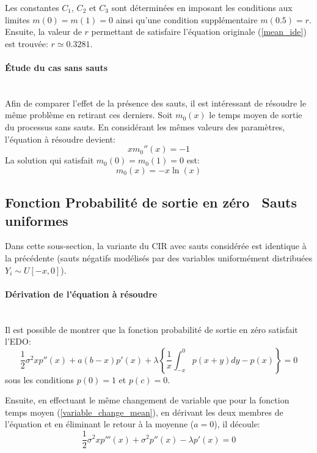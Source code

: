 Les constantes $C_1$, $C_2$ et $C_3$ sont déterminées en imposant les conditions aux limites $m(0)=m(1)=0$ ainsi qu'une condition supplémentaire $m(0.5)=r$. Ensuite, la valeur de $r$ permettant de satisfaire l'équation originale (\ref{mean_ide}) est trouvée: $r\simeq0.3281$.

\paragraph{Étude du cas sans sauts}\phantom{}\\
Afin de comparer l'effet de la présence des sauts, il est intéressant de résoudre le même problème en retirant ces derniers. Soit $m_0(x)$ le temps moyen de sortie du processus sans sauts. En considérant les mêmes valeurs des paramètres, l'équation à résoudre devient:
\begin{equation}\label{mean_3rd_order_without_jumps}
    xm_0''(x)=-1
\end{equation}
La solution qui satisfait $m_0(0)=m_0(1)=0$ est:
\begin{equation}\label{sol_mean_with_0_jumps}
    m_0(x)=-x\ln(x)
\end{equation}

\subsection{Fonction Probabilité de sortie en zéro \textemdash~Sauts uniformes}\label{subsection_probability_jumps}
Dans cette sous-section, la variante du \ac{CIR} avec sauts considérée est identique à la précédente (sauts négatifs modélisés par des variables uniformément distribuées $Y_i\sim U[-x,0]$).

\paragraph{Dérivation de l'équation à résoudre}\phantom{}\\
Il est possible de montrer que la fonction probabilité de sortie en zéro satisfait l'\acs{EDO}:
\begin{equation}\label{probability_ide}
    \frac{1}{2}\sigma^2xp''(x)+a(b-x)p'(x)+\lambda\left\{\frac{1}{x}\int_{-x}^0p(x+y)dy-p(x)\right\}=0
\end{equation}
sous les conditions $p(0)=1$ et $p(c)=0$.

Ensuite, en effectuant le même changement de variable que pour la fonction temps moyen (\ref{variable_change_mean}), en dérivant les deux membres de l'équation et en éliminant le retour à la moyenne ($a=0$), il découle:
\begin{equation}\label{probability_3rd_order}
    \frac{1}{2}\sigma^2xp'''(x)+\sigma^2p''(x)-\lambda p'(x)=0
\end{equation}
